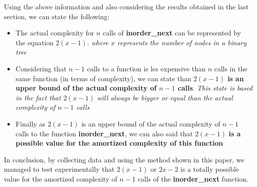 \documentclass[12p]{article}
\begin{document}
Using the above information and also considering the results obtained in the last section, we can state the following:
\begin{itemize}
  \item The actual complexity for $n$ calls of \textbf{inorder\_next } can be represented by the equation $2(x-1)$. \textit{where $x$ represents the number of nodes in a binary tree}
  \item Considering that $n-1$ calls to a function is les expensive than $n$ calls in the same function (in terms of complexity), we can state than \textbf{$2(x-1)$ is an upper bound of the actual complexity of $n-1$ calls}. \textit{This state is based in the fact that $2(x-1)$ will always be bigger or equal than the actual complexity of $n-1$ calls}
  \item Finally as $2(x-1)$ is an upper bound of the actual complexity of $n-1$ calls to the function \textbf{inorder\_next}, we can also said that $2(x-1)$ \textbf{is a possible value for the amortized complexity of this function}
\end{itemize}

\bigskip

In conclusion, by collecting data and using the method shown in this paper, we managed to test experimentally that $2(x-1)$ or $2x-2$ is a totally possible value for the amortized complexity of $n-1$ calls of the \textbf{inorder\_next} function.
\end{document}
